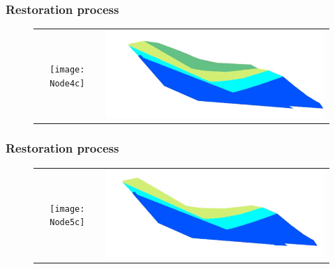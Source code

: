 \documentclass{beamer}
\begin{document}
	\begin{frame}
	\frametitle{Restoration process}
	\begin{figure}[H]
	\centering
	\begin{tabular}{@{}cc@{}}
	\texttt{[image: Node4c]}&
	\includegraphics[width=.65\textwidth]{chartreusedroite34.png}\\
	\end{tabular}
	\end{figure}
	\end{frame}
	
	\begin{frame}
	\frametitle{Restoration process}
	\begin{figure}[H]
	\centering
	\begin{tabular}{@{}cc@{}}
	\texttt{[image: Node5c]}&
	\includegraphics[width=.65\textwidth]{chartreusedroite35.png}\\
	\end{tabular}
	\end{figure}
	\end{frame}
	
\end{document}
